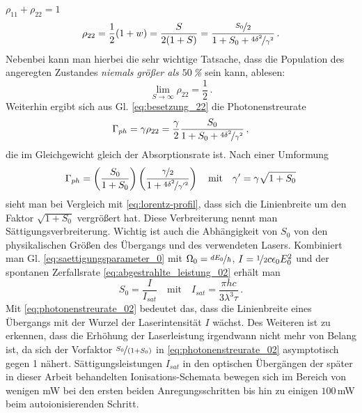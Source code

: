 $\rho_{11}+\rho_{22}=1$
\begin{equation}\label{eq:besetzung_22}
	\rho_{22}=\frac{1}{2}(1+w)=\frac{S}{2(1+S)}=\frac{\nicefrac{S_0}{2}}{1+S_0+\nicefrac{4\delta^2}{\gamma^2}}\,.
\end{equation}
Nebenbei kann man hierbei die sehr wichtige Tatsache, dass die Population des
angeregten Zustandes \textit{niemals größer als $50\,$\%} sein kann, ablesen:
\begin{equation}\label{eq:besetzung_22_kleiner-gleich_50}
	\lim_{S\to\infty}\rho_{22}=\frac{1}{2}\,.
\end{equation}
Weiterhin ergibt sich aus Gl. \eqref{eq:besetzung_22} die Photonenstreurate
\begin{equation}\label{eq:photonenstreurate_01}
	\Gamma_{ph}=\gamma\rho_{22}=\frac{\gamma}{2}\frac{S_0}{1+S_0+\nicefrac{4\delta^2}{\gamma^2}}\,,
\end{equation}
die im Gleichgewicht gleich der Absorptionsrate ist.
Nach einer Umformung
\begin{equation}\label{eq:photonenstreurate_02}
	\Gamma_{ph}=\left(\frac{S_0}{1+S_0}\right)\left(\frac{\nicefrac{\gamma}{2}}{1+\nicefrac{4\delta^2}{\gamma'^2}}\right)
	\quad\text{mit}\quad
	\gamma'=\gamma\sqrt{1+S_0}
\end{equation}
sieht man bei Vergleich mit \eqref{eq:lorentz-profil}, dass sich die
Linienbreite um den Faktor $\sqrt{1+S_0}$ vergrößert hat. Diese Verbreiterung
nennt man Sättigungsverbreiterung. Wichtig ist auch die Abhängigkeit von $S_0$
von den physikalischen Größen des Übergangs und des verwendeten Lasers.
Kombiniert man Gl. \eqref{eq:saettigungsparameter_0} mit
$\Omega_0=\nicefrac{dE_0}{\hbar}$, $I=\nicefrac{1}{2}c\epsilon_0E_0^2$ und der
spontanen Zerfallsrate \eqref{eq:abgestrahlte_leistung_02} erhält man
\begin{equation}\label{eq:saettigungsparameter_physikalische_groessen}
		S_0=\frac{I}{I_{sat}}
		\quad\text{mit}\quad
		I_{sat}=\frac{\pi hc}{3\lambda^3\tau}\,.
\end{equation}
Mit \eqref{eq:photonenstreurate_02} bedeutet das, dass die Linienbreite eines
Übergangs mit der Wurzel der Laserintensität $I$ wächst. Des Weiteren
ist zu erkennen, dass die Erhöhung der Laserleistung irgendwann nicht mehr
von Belang ist, da sich der Vorfaktor $\nicefrac{S_0}{\left(1+S_0\right)}$ in
\eqref{eq:photonenstreurate_02} asymptotisch gegen 1 nähert.
Sättigungsleistungen $I_{sat}$ in den optischen Übergängen der später in dieser
Arbeit behandelten Ionisations-Schemata bewegen sich im Bereich von wenigen
mW bei den ersten beiden Anregungsschritten bis hin zu einigen
$100\,$mW beim autoionisierenden Schritt.

